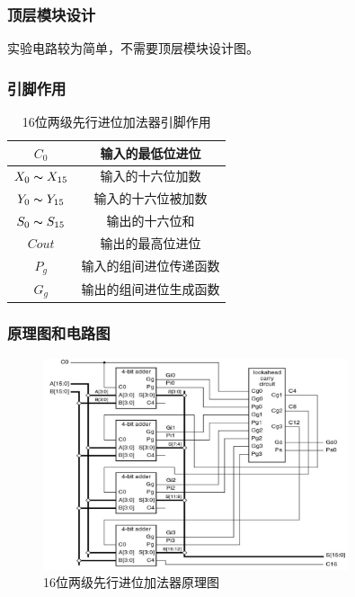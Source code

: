 \documentclass{article}
\begin{document}
    \subsubsection{顶层模块设计}
    实验电路较为简单，不需要顶层模块设计图。

    \subsubsection{引脚作用}
    \begin{table}[H]
    \centering
    \begin{tabular}{|c|c|}
        \hline
        $C_{0}$  & 输入的最低位进位 \\ \hline
        $X_{0}\thicksim X_{15}$ & 输入的十六位加数 \\ \hline
        $Y_{0}\thicksim Y_{15}$   & 输入的十六位被加数 \\ \hline
        $S_{0}\thicksim S_{15}$   & 输出的十六位和 \\ \hline
        $Cout$   & 输出的最高位进位 \\ \hline
        $P_{g}$   & 输入的组间进位传递函数 \\ \hline
        $G_{g}$   & 输出的组间进位生成函数 \\ \hline
    \end{tabular}
    \caption{16位两级先行进位加法器引脚作用}
    \end{table}

    \subsubsection{原理图和电路图}
    \begin{figure}[H]
    \centering
    \includegraphics[width=0.8\textwidth]{3.4.1.png}
    \caption{16位两级先行进位加法器原理图}
    \end{figure}
\end{document}
